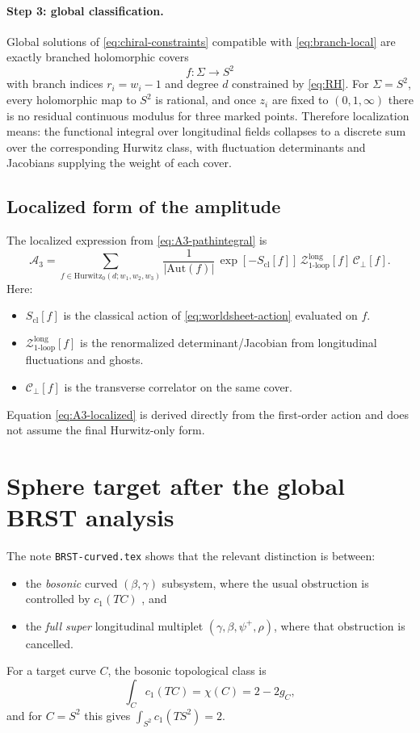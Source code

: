 \documentclass[11pt]{article}
\newcommand{\mc}[1]{\mathcal{#1}}
\begin{document}
\paragraph{Step 3: global classification.}
Global solutions of \eqref{eq:chiral-constraints} compatible with \eqref{eq:branch-local} are exactly branched holomorphic covers
\begin{equation}
f:\Sigma\to S^2
\end{equation}
with branch indices $r_i=w_i-1$ and degree $d$ constrained by \eqref{eq:RH}. For $\Sigma=S^2$, every holomorphic map to $S^2$ is rational, and once $z_i$ are fixed to $(0,1,\infty)$ there is no residual continuous modulus for three marked points. Therefore localization means: the functional integral over longitudinal fields collapses to a discrete sum over the corresponding Hurwitz class, with fluctuation determinants and Jacobians supplying the weight of each cover.

\subsection{Localized form of the amplitude}
The localized expression from \eqref{eq:A3-pathintegral} is
\begin{equation}\label{eq:A3-localized}
\mc A_3
=
\sum_{f\in \mathrm{Hurwitz}_0(d;w_1,w_2,w_3)}
\frac{1}{|\mathrm{Aut}(f)|}\,
\exp[-S_{\mathrm{cl}}[f]]\,
\mc Z^{\mathrm{long}}_{1\text{-}\mathrm{loop}}[f]\,
\mc C_\perp[f].
\end{equation}
Here:
\begin{itemize}
\item $S_{\mathrm{cl}}[f]$ is the classical action of \eqref{eq:worldsheet-action} evaluated on $f$.
\item $\mc Z^{\mathrm{long}}_{1\text{-}\mathrm{loop}}[f]$ is the renormalized determinant/Jacobian from longitudinal fluctuations and ghosts.
\item $\mc C_\perp[f]$ is the transverse correlator on the same cover.
\end{itemize}

Equation \eqref{eq:A3-localized} is derived directly from the first-order action and does not assume the final Hurwitz-only form.

\section{Sphere target after the global BRST analysis}
The note \texttt{BRST-curved.tex} shows that the relevant distinction is between:
\begin{itemize}
\item the \emph{bosonic} curved $(\beta,\gamma)$ subsystem, where the usual obstruction is controlled by $c_1(TC)$ \cite{nekrasov2005curvedbetagammasystems}, and
\item the \emph{full super} longitudinal multiplet $(\gamma,\beta,\psi^+,\rho)$, where that obstruction is cancelled.
\end{itemize}
For a target curve $C$, the bosonic topological class is
\begin{equation}\label{eq:c1-s2}
\int_C c_1(TC)=\chi(C)=2-2g_C,
\end{equation}
and for $C=S^2$ this gives $\int_{S^2}c_1(TS^2)=2$.
\end{document}
